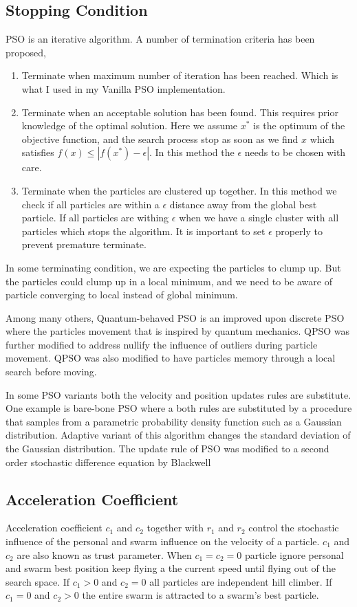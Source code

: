 \documentclass{article}
\begin{document}
\subsection{Stopping Condition}
PSO is an iterative algorithm. A number of termination criteria has been proposed,
\begin{enumerate}
    \item Terminate when maximum number of iteration has been reached. Which is what I used in my Vanilla PSO implementation.
    \item Terminate when an acceptable solution has been found. This requires prior knowledge of the optimal solution. Here we assume $x^*$ is the optimum of the objective function, and the search process stop as soon as we find $x$ which satisfies $f(x) \le |f(x^*) - \epsilon|$. In this method the $\epsilon$ needs to be chosen with care.
    \item Terminate when the particles are clustered up together. In this method we check if all particles are within a $\epsilon$ distance away from the global best particle. If all particles are withing $\epsilon$ when we have a single cluster with all particles which stops the algorithm. It is important to set $\epsilon$ properly to prevent premature terminate.
\end{enumerate}
In some terminating condition, we are expecting the particles to clump up. But the particles could clump up in a local minimum, and we need to be aware of particle converging to local instead of global minimum.

Among many others, Quantum-behaved PSO is an improved upon discrete PSO where the particles movement that is inspired by quantum mechanics. QPSO was further modified to address nullify the influence of outliers during particle movement. QPSO was also modified to have particles memory through a local search before moving.

In some PSO variants both the velocity and position updates rules are substitute. One example is bare-bone PSO where a both rules are substituted by a procedure that samples from a parametric probability density function such as a Gaussian distribution. Adaptive variant of this algorithm changes the standard deviation of the Gaussian distribution. The update rule of PSO was modified to a second order stochastic difference equation by Blackwell \cite{blackwell2011study}

\subsection{Acceleration Coefficient}
Acceleration coefficient $c_1$ and $c_2$ together with $r_1$ and $r_2$ control the stochastic influence of the personal and swarm influence on the velocity of a particle. $c_1$ and $c_2$ are also known as trust parameter. When $c_1 = c_2 = 0$ particle ignore personal and swarm best position keep flying a the current speed until flying out of the search space. If $c_1 > 0$ and $c_2 = 0$ all particles are independent hill climber. If $c_1=0$ and $c_2 > 0$ the entire swarm is attracted to a swarm's best particle.
\end{document}
